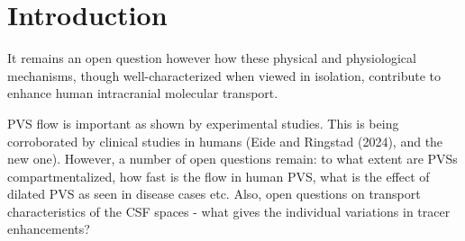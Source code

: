 
 \section{Introduction}
It remains an open question however how these physical and
physiological mechanisms, though well-characterized when viewed in
isolation, contribute to enhance human intracranial molecular
transport.

PVS flow is important as shown by experimental studies. This is being
corroborated by clinical studies in humans (Eide and Ringstad (2024),
and the new one). However, a number of open questions remain: to what
extent are PVSs compartmentalized, how fast is the flow in human PVS,
what is the effect of dilated PVS as seen in disease cases etc.  Also,
open questions on transport characteristics of the CSF spaces - what
gives the individual variations in tracer enhancements? 

